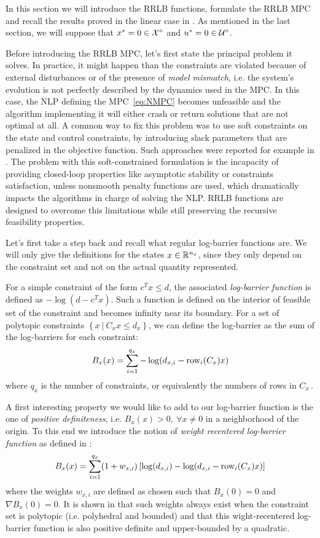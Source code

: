 \documentclass[12pt]{article}
\begin{document}
In this section we will introduce the RRLB functions, formulate the RRLB MPC and recall the results proved in the linear case in \cite{RRLB-linear-MPC}.
As mentioned in the last section, we will suppose that $x^*=0\in\cal{X}^\circ$ and $u^*=0\in\cal{U}^\circ$.

Before introducing the RRLB MPC, let's first state the principal problem it solves.
In practice, it might happen than the constraints are violated because of external disturbances or of the presence of \textit{model mismatch}, i.e. the system's evolution is not perfectly described by the dynamics used in the MPC.
In this case, the NLP defining the MPC~\ref{eq:NMPC} becomes unfeasible and the algorithm implementing it will either crash or return solutions that are not optimal at all.
A common way to fix this problem was to use soft constraints on the state and control constraints, by introducing slack parameters that are penalized in the objective function.
Such approaches were reported for example in \cite{soft-constrained-MPC}.
The problem with this soft-constrained formulation is the incapacity of providing closed-loop properties like asymptotic stability or constraints satisfaction, unless nonsmooth penalty functions are used, which dramatically impacts the algorithms in charge of solving the NLP.
RRLB functions are designed to overcome this limitations while still preserving the recursive feasibility properties.

\vspace{12pt}

Let's first take a step back and recall what regular log-barrier functions are.
We will only give the definitions for the states $x\in\R^{n_x}$, since they only depend on the constraint set and not on the actual quantity represented.

For a simple constraint of the form $c^Tx\leq d$, the associated \textit{log-barrier function} is defined as $-\log(d-c^Tx)$.
Such a function is defined on the interior of feasible set of the constraint and becomes infinity near its boundary.
For a set of polytopic constraints $\left\{ x~|~C_xx\leq d_x \right\}$, we can define the log-barrier as the sum of the log-barriers for each constraint:
$$B_x(x)=\sum_{i=1}^{q_x}-\log(d_{x,i}-\rm{row}_i(C_x)x)$$
where $q_x$ is the number of constraints, or equivalently the numbers of rows in $C_x$\,.

A first interesting property we would like to add to our log-barrier function is the one of \textit{positive definiteness}, i.e. $B_x(x)>0,~\forall x\neq 0$ in a neighborhood of the origin.
To this end we introduce the notion of \textit{weight recentered log-barrier function} as defined in \cite{RLB}:
$$B_x(x)=\sum_{i=1}^{q_x}(1+w_{x,i})\left[\log(d_{x,i})-\log(d_{x,i}-\rm{row}_i(C_x)x)\right]$$
where the weights $w_{x,i}$ are defined as chosen such that $B_x(0)=0$ and $\nabla B_x(0)=0$.
It is shown in \cite{RLB} that such weights always exist when the constraint set is polytopic (i.e. polyhedral and bounded) and that this wight-recentered log-barrier function is also positive definite and upper-bounded by a quadratic.
\end{document}
